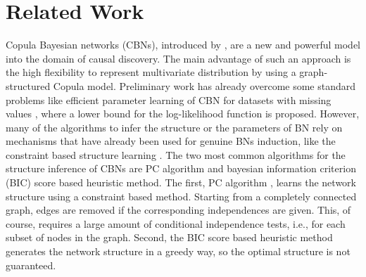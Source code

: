 \section{Related Work} 
\label{sec:soa}

Copula Bayesian networks  (CBNs), introduced by \cite{ElidanCopula}, are a new and powerful model into
the domain of causal discovery. The main advantage of such an approach is the high flexibility to represent
multivariate distribution by using a graph-structured Copula model.
Preliminary work has already overcome some standard problems like
efficient parameter learning of CBN for datasets with missing values \cite{ElidanInferenceLess}, where a lower bound for the log-likelihood function is proposed.
%
However, many of the algorithms to infer the structure or the parameters of BN rely on mechanisms that have
already been used for genuine BNs induction, like the constraint based structure learning \cite{Friedman99}. %
The two most common algorithms for the structure inference of CBNs are PC algorithm and bayesian information criterion (BIC) score based heuristic method.
The first, PC algorithm \cite{pc_spirtes}, learns the network structure using a constraint based method.
Starting from a completely connected graph, edges are removed if the corresponding 
independences are given.
This, of course, requires a large amount of conditional independence tests, i.e., for each subset of nodes in 
the graph. 
Second, 
the BIC score based heuristic method \cite{schwarz78} generates the network structure 
in a greedy way, so the optimal structure is not guaranteed. %
